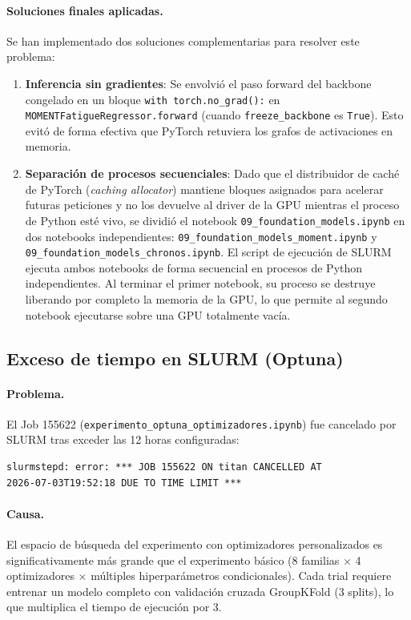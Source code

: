 \documentclass[12pt, a4paper]{article}
\newcommand{\code}[1]{\texttt{#1}}
\begin{document}
\paragraph{Soluciones finales aplicadas.}
Se han implementado dos soluciones complementarias para resolver este problema:
\begin{enumerate}
    \item \textbf{Inferencia sin gradientes}: Se envolvió el paso forward del backbone congelado en un bloque \code{with torch.no\_grad():} en \code{MOMENTFatigueRegressor.forward} (cuando \code{freeze\_backbone} es \code{True}). Esto evitó de forma efectiva que PyTorch retuviera los grafos de activaciones en memoria.
    \item \textbf{Separación de procesos secuenciales}: Dado que el distribuidor de caché de PyTorch (\textit{caching allocator}) mantiene bloques asignados para acelerar futuras peticiones y no los devuelve al driver de la GPU mientras el proceso de Python esté vivo, se dividió el notebook \code{09\_foundation\_models.ipynb} en dos notebooks independientes: \code{09\_foundation\_models\_moment.ipynb} y \code{09\_foundation\_models\_chronos.ipynb}. El script de ejecución de SLURM ejecuta ambos notebooks de forma secuencial en procesos de Python independientes. Al terminar el primer notebook, su proceso se destruye liberando por completo la memoria de la GPU, lo que permite al segundo notebook ejecutarse sobre una GPU totalmente vacía.
\end{enumerate}

\subsection{Exceso de tiempo en SLURM (Optuna)}
\label{sec:problemas_slurm}

\paragraph{Problema.}
El Job 155622 (\code{experimento\_optuna\_optimizadores.ipynb}) fue cancelado por SLURM tras exceder las 12 horas configuradas:
\begin{verbatim}
slurmstepd: error: *** JOB 155622 ON titan CANCELLED AT
2026-07-03T19:52:18 DUE TO TIME LIMIT ***
\end{verbatim}

\paragraph{Causa.}
El espacio de búsqueda del experimento con optimizadores personalizados es significativamente más grande que el experimento básico (8 familias $\times$ 4 optimizadores $\times$ múltiples hiperparámetros condicionales). Cada trial requiere entrenar un modelo completo con validación cruzada GroupKFold (3 splits), lo que multiplica el tiempo de ejecución por 3.
\end{document}
